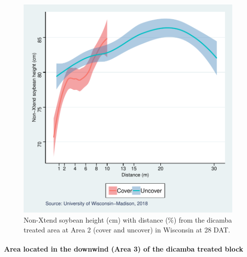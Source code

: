 \documentclass[]{article}
\let\oldparagraph\paragraph
\renewcommand{\paragraph}[1]{\oldparagraph{#1}\mbox{}}
\begin{document}
\begin{figure}
\centering
\includegraphics{Report_files/figure-latex/unnamed-chunk-109-1.pdf}
\caption{Non-Xtend soybean height (cm) with distance (\%) from the
dicamba treated area at Area 2 (cover and uncover) in Wisconsin at 28
DAT.}
\end{figure}

\pagebreak
\newpage

\paragraph{Area located in the downwind (Area 3) of the dicamba treated
block}\label{area-located-in-the-downwind-area-3-of-the-dicamba-treated-block-1}
\end{document}

